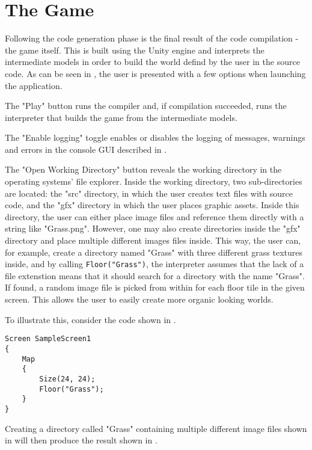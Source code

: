 \section{The Game}
Following the code generation phase is the final result of the code compilation - the game itself. 
This is built using the Unity engine and interprets the intermediate models in order to build the world defind by the user in the \dazel{} source code. As can be seen in , the user is presented with a few options when launching the application.

 
The "Play" button runs the \dazel{} compiler and, if compilation succeeded, runs the interpreter that builds the game from the intermediate models. 


The "Enable logging" toggle enables or disables the logging of messages, warnings and errors in the console GUI described in .


The "Open Working Directory" button reveals the working directory in the operating systems' file explorer.
Inside the working directory, two sub-directories are located: the "src" directory, in which the user creates text files with source code, and the "gfx" directory in which the user places graphic assets. Inside this directory, the user can either place image files and reference them directly with a string like "Grass.png". However, one may also create directories inside the "gfx" directory and place multiple different images files inside. This way, the user can, for example, create a directory named "Grass" with three different grass textures inside, and by calling \texttt{Floor("Grass")}, the interpreter assumes that the lack of a file extenstion means that it should search for a directory with the name "Grass". If found, a random image file is picked from within for each floor tile in the given screen. This allows the user to easily create more organic looking worlds. 


To illustrate this, consider the \dazel{} code shown in .
\begin{lstlisting}[language=CSharp, caption={}, label={lst:DazelGrassExample},escapechar=|]
Screen SampleScreen1 
{
	Map 
	{
		Size(24, 24);
		Floor("Grass");
	}
}
\end{lstlisting}

Creating a directory called "Grass" containing multiple different image files shown in  will then produce the result shown in .

